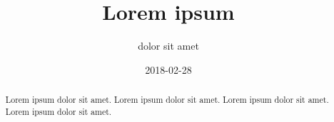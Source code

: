\documentclass[a4j, uplatex]{jsarticle}
\numberwithin{equation}{section}
\numberwithin{figure}{section}
\numberwithin{table}{section}
\begin{document}
\title{Lorem ipsum}
\author{dolor sit amet}
\date{2018-02-28}
\maketitle

\begin{abstract}
Lorem ipsum dolor sit amet. Lorem ipsum dolor sit amet.
Lorem ipsum dolor sit amet. Lorem ipsum dolor sit amet.
\end{abstract}

\tableofcontents

\newpage
\newpage
\newpage
\newpage
\newpage
\newpage\printbibliography[title=References]

\newpage
\appendix
\begin{refsection}

\printbibliography[title=References]
\end{refsection}
\end{document}
